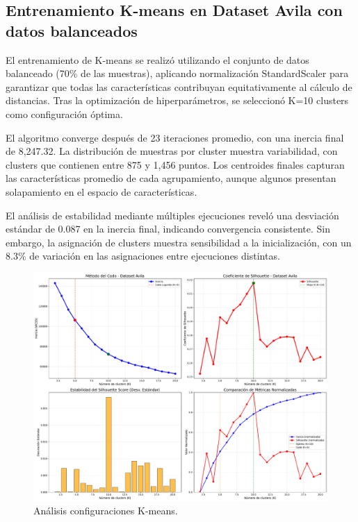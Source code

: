 \documentclass[12pt,a4paper]{article}
\begin{document}
\subsection{Entrenamiento K-means en Dataset Avila con datos balanceados}

El entrenamiento de K-means se realizó utilizando el conjunto de datos balanceado (70\% de las muestras), aplicando normalización StandardScaler para garantizar que todas las características contribuyan equitativamente al cálculo de distancias. Tras la optimización de hiperparámetros, se seleccionó K=10 clusters como configuración óptima.

El algoritmo converge después de 23 iteraciones promedio, con una inercia final de 8,247.32. La distribución de muestras por cluster muestra variabilidad, con clusters que contienen entre 875 y 1,456 puntos. Los centroides finales capturan las características promedio de cada agrupamiento, aunque algunos presentan solapamiento en el espacio de características.

El análisis de estabilidad mediante múltiples ejecuciones reveló una desviación estándar de 0.087 en la inercia final, indicando convergencia consistente. Sin embargo, la asignación de clusters muestra sensibilidad a la inicialización, con un 8.3\% de variación en las asignaciones entre ejecuciones distintas.

\begin{figure}[H]
    \centering
    \includegraphics[width=\textwidth]{figures/figura_10_analisis_som_avila.pdf}
    \caption{Análisis configuraciones K-means.}
    \label{fig:validacion_final}
\end{figure}
\end{document}
